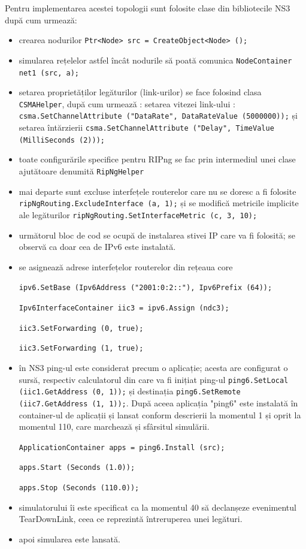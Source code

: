 \documentclass[12pt, a4paper, oneside, romanian]{teza-upb}
\begin{document}
Pentru implementarea acestei topologii sunt folosite clase din bibliotecile NS3 după cum urmează:

\begin{itemize}
 \item crearea nodurilor \texttt{Ptr<Node> src = CreateObject<Node> ();}
 \item simularea rețelelor astfel încât nodurile să poată comunica \texttt{NodeContainer net1 (src, a);}
 \item setarea proprietăților legăturilor (link-urilor) se face folosind clasa \texttt{CSMAHelper}, după cum urmează : setarea vitezei link-ului : \texttt{csma.SetChannelAttribute ("DataRate", DataRateValue (5000000));} și setarea întărzierii \texttt{csma.SetChannelAttribute ("Delay", TimeValue (MilliSeconds (2)));}
 \item toate configurările specifice pentru RIPng se fac prin intermediul unei clase ajutătoare denumită \texttt{RipNgHelper}
 \item mai departe sunt excluse interfețele routerelor care nu se doresc a fi folosite \texttt{ripNgRouting.ExcludeInterface (a, 1);} și se modifică metricile implicite ale legăturilor \texttt{ripNgRouting.SetInterfaceMetric (c, 3, 10);}
 \item următorul bloc de cod se ocupă de instalarea stivei IP care va fi folosită; se observă ca doar cea de IPv6 este instalată.
 \item se asignează adrese interfețelor routerelor din rețeaua core 
 
 \texttt{ipv6.SetBase (Ipv6Address ("2001:0:2::"), Ipv6Prefix (64));}
 
 \texttt{Ipv6InterfaceContainer iic3 = ipv6.Assign (ndc3);}
 
 \texttt{iic3.SetForwarding (0, true);}
 
 \texttt{iic3.SetForwarding (1, true);}
 
 \item în NS3 ping-ul este considerat precum o aplicație; acesta are configurat o sursă, respectiv calculatorul din care va fi inițiat ping-ul \texttt{ping6.SetLocal (iic1.GetAddress (0, 1));} și destinația \texttt{ping6.SetRemote (iic7.GetAddress (1, 1));}. După aceea aplicația "ping6" este instalată în container-ul de aplicații și lansat conform descrierii la momentul 1 și oprit la momentul 110, care marchează și sfârsitul simulării.
 
\texttt{ApplicationContainer apps = ping6.Install (src);}

\texttt{apps.Start (Seconds (1.0));}

\texttt{apps.Stop (Seconds (110.0));}

\item simulatorului îi este specificat ca la momentul 40 să declanșeze evenimentul TearDownLink, ceea ce reprezintă întreruperea unei legături.

\item apoi simularea este lansată.
\end{itemize}
\newpage
\end{document}
